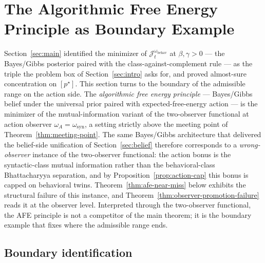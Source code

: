\documentclass[11pt]{article}
\theoremstyle{definition}
\theoremstyle{remark}
\begin{document}
\section{The Algorithmic Free Energy Principle as Boundary Example}
\label{sec:boundary-example}
\label{sec:near-miss}

Section~\ref{sec:main} identified the minimizer of $\mathcal J_t^{\omega_{\mathrm{behav}}}$ at $\beta,\gamma>0$ --- the Bayes/Gibbs posterior paired with the class-against-complement rule --- as the triple the problem box of Section~\ref{sec:intro} asks for, and proved almost-sure concentration on $[p^\star]$. This section turns to the boundary of the admissible range on the action side. The \emph{algorithmic free energy principle} --- Bayes/Gibbs belief under the universal prior paired with expected-free-energy action --- is the minimizer of the mutual-information variant of the two-observer functional at action observer $\omega_A=\omega_{\mathrm{syn}}$, a setting strictly above the meeting point of Theorem~\ref{thm:meeting-point}. The same Bayes/Gibbs architecture that delivered the belief-side unification of Section~\ref{sec:belief} therefore corresponds to a \emph{wrong-observer} instance of the two-observer functional: the action bonus is the syntactic-class mutual information rather than the behavioral-class Bhattacharyya separation, and by Proposition~\ref{prop:action-cap} this bonus is capped on behavioral twins. Theorem~\ref{thm:afe-near-miss} below exhibits the structural failure of this instance, and Theorem~\ref{thm:observer-promotion-failure} reads it at the observer level. Interpreted through the two-observer functional, the AFE principle is not a competitor of the main theorem; it is the boundary example that fixes where the admissible range ends.

\subsection{Boundary identification}
\label{sec:boundary-identification}
\end{document}
